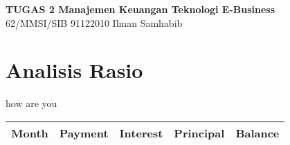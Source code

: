 \documentclass{article}
\begin{document}
\begin{center}
    \textbf{TUGAS 2 Manajemen Keuangan Teknologi E-Business}\\
    62/MMSI/SIB 91122010 Ilman Samhabib
\end{center}
\section*{Analisis Rasio}
how are you
\begin{center}
    \begin{tabular}{ |p{2cm}|p{2cm}|p{2cm}|p{2cm}|p{2cm}|}
        \hline
        Month & Payment & Interest & Principal & Balance\\ 
        \hline
        
    \end{tabular}
\end{center}
\end{document}
